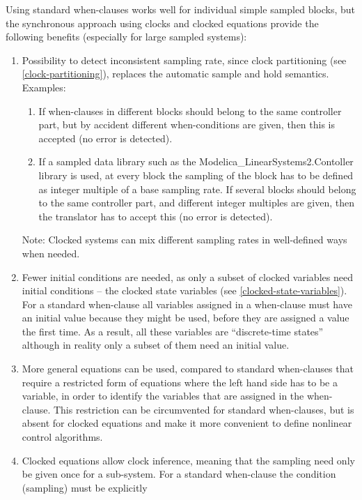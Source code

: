\begin{nonnormative}
Using standard when-clauses works well for individual simple sampled blocks, but the synchronous approach using clocks and clocked equations provide the following benefits (especially for large sampled systems):
\begin{enumerate}
\item
  Possibility to detect inconsistent sampling rate, since clock partitioning (see \cref{clock-partitioning}),
  replaces the automatic sample and hold semantics. Examples:
  \begin{enumerate}
  \def\labelenumii{\alph{enumii}.}
  \item
    If when-clauses in different blocks should belong to the same
    controller part, but by accident different when-conditions are
    given, then this is accepted (no error is detected).
  \item
    If a sampled data library such as the
    Modelica\_LinearSystems2.Contoller library is used, at every block
    the sampling of the block has to be defined as integer multiple of a
    base sampling rate. If several blocks should belong to the same
    controller part, and different integer multiples are given, then the
    translator has to accept this (no error is detected).
  \end{enumerate}
  Note: Clocked systems can mix different sampling rates
  in well-defined ways when needed.
\item
  Fewer initial conditions are needed, as only a subset of clocked
  variables need initial conditions -- the clocked state variables (see \cref{clocked-state-variables}).
  For a standard when-clause all variables
  assigned in a when-clause must have an initial value
  because they might be used, before they are assigned a value the first
  time. As a result, all these variables are ``discrete-time states''
  although in reality only a subset of them need an initial
  value.
\item
  More general equations can be used, compared to standard when-clauses that require
  a restricted form of equations where the left hand side has to be a variable, in order
  to identify the variables that are assigned in the when-clause.
  This restriction can be circumvented for standard when-clauses, but is
  absent for clocked equations and make it more convenient to define
  nonlinear control algorithms.
\item
  Clocked equations allow clock inference,
  meaning that the sampling need only be given once for a sub-system.
  For a standard when-clause the condition (sampling) must be explicitly

\end{enumerate}
\end{nonnormative}
